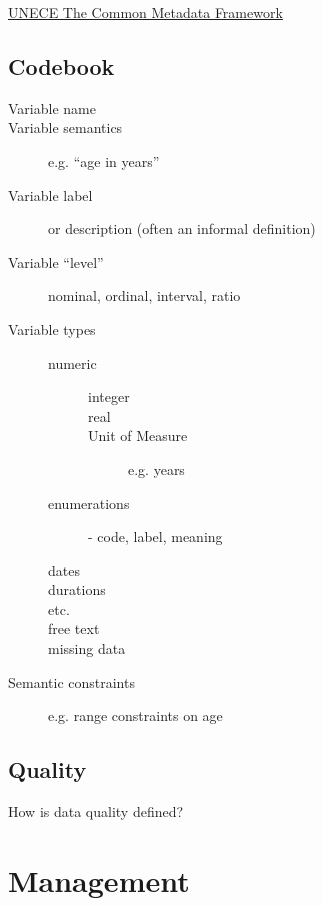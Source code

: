 \documentclass[reqno,12pt]{tufte-book}
\numberwithin{equation}{subsection}
\begin{document}
\href{http://www1.unece.org/stat/platform/display/metis/The+Common+Metadata+Framework}{UNECE The Common Metadata Framework}

\chapter{Codebook}

\begin{description}
  \item [Variable name]
  \item [Variable semantics] e.g. ``age in years''
  \item [Variable label] or description  (often an informal definition)
    \item [Variable ``level''] nominal, ordinal, interval, ratio
  \item [Variable types]
    \begin{description}
    \item [numeric]
      \begin{description}
      \item [integer]
      \item [real]
      \item [Unit of Measure] e.g. years
      \end{description}
    \item [enumerations] - code, label, meaning
    \item [dates]
    \item [durations]
    \item [etc.]
    \item [free text]
    \item [missing data]
    \end{description}
  \item [Semantic constraints] e.g. range constraints on age
\end{description}

\chapter{Quality}

How is data quality defined?

\part{Management}
\end{document}
